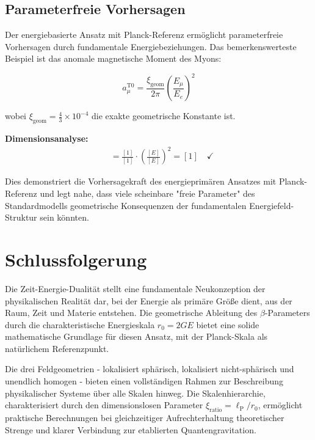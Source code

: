 \documentclass[12pt,a4paper]{report}
\newcommand{\lP}{\ell_{\text{P}}}         %
\newcommand{\rzero}{r_0}                  %
\newcommand{\xigeom}{\xi_{\text{geom}}}   %
\newcommand{\xirat}{\xi_{\text{ratio}}}   %
\begin{document}
	\subsection{Parameterfreie Vorhersagen}\label{subsec:parameter_free_predictions}
	
	Der energiebasierte Ansatz mit Planck-Referenz ermöglicht parameterfreie Vorhersagen durch fundamentale Energiebeziehungen. Das bemerkenswerteste Beispiel ist das anomale magnetische Moment des Myons:
	
	\begin{equation}
		a_\mu^{\text{T0}} = \frac{\xigeom}{2\pi} \left(\frac{E_\mu}{E_e}\right)^2
	\end{equation}
	
	wobei $\xigeom = \frac{4}{3} \times 10^{-4}$ die exakte geometrische Konstante ist.
	
	\textbf{Dimensionsanalyse:}
	\begin{align}
		[a_\mu^{\text{T0}}] &= \frac{[1]}{[1]} \cdot \left(\frac{[E]}{[E]}\right)^2 = [1] \quad \checkmark
	\end{align}
	
	Dies demonstriert die Vorhersagekraft des energieprimären Ansatzes mit Planck-Referenz und legt nahe, dass viele scheinbare "freie Parameter" des Standardmodells geometrische Konsequenzen der fundamentalen Energiefeld-Struktur sein könnten.
	
	\section{Schlussfolgerung}\label{sec:conclusion}
	
	Die Zeit-Energie-Dualität stellt eine fundamentale Neukonzeption der physikalischen Realität dar, bei der Energie als primäre Größe dient, aus der Raum, Zeit und Materie entstehen. Die geometrische Ableitung des $\beta$-Parameters durch die charakteristische Energieskala $\rzero = 2GE$ bietet eine solide mathematische Grundlage für diesen Ansatz, mit der Planck-Skala als natürlichem Referenzpunkt.
	
	Die drei Feldgeometrien - lokalisiert sphärisch, lokalisiert nicht-sphärisch und unendlich homogen - bieten einen vollständigen Rahmen zur Beschreibung physikalischer Systeme über alle Skalen hinweg. Die Skalenhierarchie, charakterisiert durch den dimensionslosen Parameter $\xirat = \lP/\rzero$, ermöglicht praktische Berechnungen bei gleichzeitiger Aufrechterhaltung theoretischer Strenge und klarer Verbindung zur etablierten Quantengravitation.
	
\end{document}
